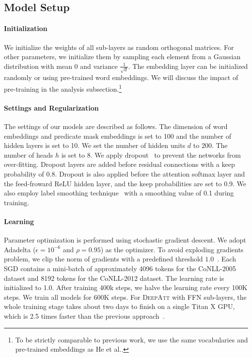 \documentclass[letterpaper]{article} \usepackage{aaai18}  \usepackage{times}  \usepackage{helvet}  \usepackage{courier}  \usepackage{url}  \usepackage{graphicx}  \frenchspacing  \setlength{\pdfpagewidth}{8.5in}  \setlength{\pdfpageheight}{11in}  \usepackage{latexsym}
\begin{document}
\subsection{Model Setup}
\paragraph{Initialization} We initialize the weights of all sub-layers as random orthogonal matrices. For other parameters, we initialize them by sampling each element from a Gaussian distribution with mean $0$ and variance $\frac{1}{\sqrt{d}}$. The embedding layer can be initialized randomly or using pre-trained word embeddings. We will discuss the impact of pre-training in the analysis subsection.\footnote{To be strictly comparable to previous work, we use the same vocabularies and pre-trained embeddings as He et al..}

\paragraph{Settings and Regularization} The settings of our models are described as follows. The dimension of word embeddings and predicate mask embeddings is set to 100 and the number of hidden layers is set to 10. We set the number of hidden units $d$ to $200$. The number of heads $h$ is set to 8. We apply dropout~\cite{srivastava2014dropout} to prevent the networks from over-fitting. Dropout layers are added before residual connections with a keep probability of 0.8. Dropout is also applied before the attention softmax layer and the feed-froward ReLU hidden layer, and the keep probabilities are set to 0.9. We also employ label smoothing technique~\cite{szegedy2016rethinking} with a smoothing value of 0.1 during training.

\paragraph{Learning}
Parameter optimization is performed using stochastic gradient descent. We adopt Adadelta \cite{zeiler2012adadelta} ($ \epsilon= 10^{−6}$ and $\rho = 0.95$) as the optimizer. To avoid exploding gradients problem, we clip the norm of gradients with a predefined threshold $1.0$~\cite{pascanu2013construct}. Each SGD contains a mini-batch of approximately 4096 tokens for the CoNLL-2005 dataset and 8192 tokens for the CoNLL-2012 dataset. The learning rate is initialized to 1.0. After training 400k steps, we halve the learning rate every 100K steps. We train all models for 600K steps. For \textsc{DeepAtt} with FFN sub-layers, the whole training stage takes about two days to finish on a single Titan X GPU, which is 2.5 times faster than the previous approach~\cite{he2017deep}.
\end{document}
